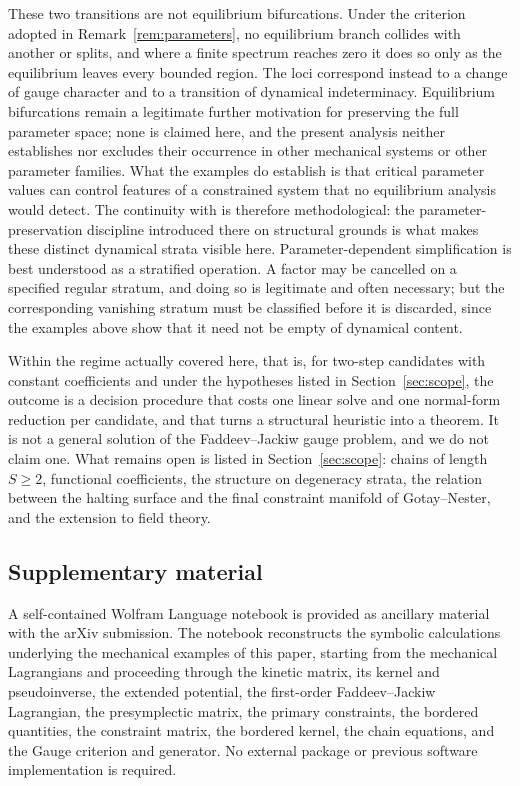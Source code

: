 \documentclass[12pt]{article}
\theoremstyle{plain}
\theoremstyle{definition}
\theoremstyle{remark}
\begin{document}
	These two transitions are not equilibrium bifurcations. Under the criterion
	adopted in Remark~\ref{rem:parameters}, no equilibrium branch collides with
	another or splits, and where a finite spectrum reaches zero it does so only as
	the equilibrium leaves every bounded region. The loci correspond instead to a
	change of gauge character and to a transition of dynamical indeterminacy.
	Equilibrium bifurcations remain a legitimate further motivation for preserving
	the full parameter space; none is claimed here, and the present analysis
	neither establishes nor excludes their occurrence in other mechanical systems
	or other parameter families. What the examples do establish is that critical
	parameter values can control features of a constrained system that no
	equilibrium analysis would detect. The continuity with \cite{CLMCP2026} is
	therefore methodological: the parameter-preservation discipline introduced
	there on structural grounds is what makes these distinct dynamical strata
	visible here. Parameter-dependent simplification is best understood as a
	stratified operation. A factor may be cancelled on a specified regular
	stratum, and doing so is legitimate and often necessary; but the corresponding
	vanishing stratum must be classified before it is discarded, since the
	examples above show that it need not be empty of dynamical content.
	
	Within the regime actually covered here, that is, for two-step candidates with
	constant coefficients and under the hypotheses listed in
	Section~\ref{sec:scope}, the outcome is a decision procedure that costs one
	linear solve and one normal-form reduction per candidate, and that turns a
	structural heuristic into a theorem. It is not a general solution of the
	Faddeev--Jackiw gauge problem, and we do not claim one. What remains open is
	listed in Section~\ref{sec:scope}: chains of length $S\geq2$, functional
	coefficients, the structure on degeneracy strata, the relation between the
	halting surface and the final constraint manifold of Gotay--Nester, and the
	extension to field theory.
	
	\subsection*{Supplementary material}
	
	A self-contained Wolfram Language notebook is provided as ancillary material
	with the arXiv submission. The notebook reconstructs the symbolic calculations
	underlying the mechanical examples of this paper, starting from the mechanical
	Lagrangians and proceeding through the kinetic matrix, its kernel and
	pseudoinverse, the extended potential, the first-order Faddeev--Jackiw
	Lagrangian, the presymplectic matrix, the primary constraints, the bordered
	quantities, the constraint matrix, the bordered kernel, the chain equations,
	and the Gauge criterion and generator. No external package or previous
	software implementation is required.
	
\end{document}
